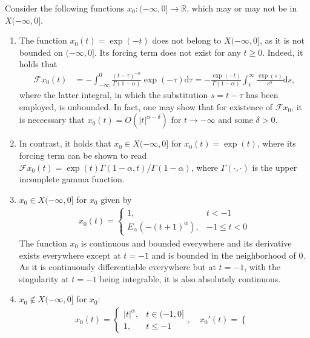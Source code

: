 \documentclass{svproc}
\newcommand{\realnumbers}{\mathbb{R}}
\newcommand{\dsomething}[1]{\mathrm{d}#1}
\begin{document}
\begin{example}\label{ex_initialFunctions} Consider the following functions $x_0:(-\infty,0]\to \realnumbers$, which may or may not be in $X(-\infty,0]$.
	\begin{enumerate}[label=(\roman*)]
		\item \label{item_exp-t}The function $x_0(t) = \exp(-t)$ does not belong to $X(-\infty,0]$,  as it is not bounded on $(-\infty,0]$. Its forcing term does not exist for any $t\geq 0$. Indeed, it holds that 
		\begin{align}
			\mathcal F x_0(t) &= -\int_{-\infty}^0\frac{(t-\tau)^{-\alpha}}{\Gamma(1-\alpha)}\exp(-\tau)\dsomething{\tau}= -\frac{\exp(-t)}{\Gamma(1-\alpha)}\int_{t}^\infty\frac{\exp(s)}{s^{\alpha}}\dsomething{s},
		\end{align} where the latter integral, in which the substitution $s = t -\tau$ has been employed, is unbounded. In fact, one may show that for existence of $\mathcal F x_0$, it is neccessary that $x_0(t) = O(|t|^{\alpha -\delta})$ for $t\to -\infty$ and some $\delta>0$.
		\item \label{item_exp+t} In contrast, it holds that $x_0 \in X(-\infty,0]$ for $x_0(t)= \exp(t)$, where its forcing term can be shown to read $\mathcal F x_0(t) = \exp (t) \Gamma(1-\alpha,t)/\Gamma(1-\alpha)$, where $\Gamma(\cdot,\cdot)$ is the upper incomplete gamma function.
		\item \label{item_mittag_leffler}$x_0 \in X(-\infty,0]$ for $x_0$ given by \begin{align}
			x_0(t)=\begin{cases}
				1, & t<-1\\
				E_\alpha(-(t+1)^\alpha),&-1\leq t<0
			\end{cases}
		\end{align}
		The function $x_0$ is continuous and bounded everywhere and its derivative exists everywhere except at $t=-1$ and is bounded in the neighborhood of $0$. {As it is continuously differentiable everywhere but at $t=-1$, with the singularity at $t=-1$ being integrable, it is also absolutely continuous.}
		\item \label{item_unbouded_der_at0}$x_0 \notin X(-\infty,0]$ for $x_0$: \begin{align}
			x_0(t) = \begin{cases}
				|t|^\alpha,&t\in (-1,0]\\
				1,&t\leq -1
			\end{cases},
			\quad x_0'(t) = \begin{cases}

\end{cases}
\end{align}
\end{enumerate}
\end{example}
\end{document}
